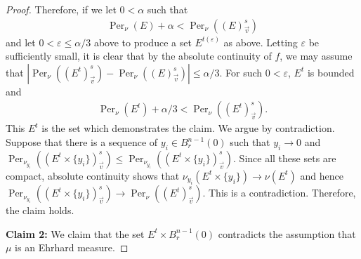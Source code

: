\documentclass[12pt]{amsart}
\numberwithin{equation}{section}
\theoremstyle{plain}
\theoremstyle{definition}
\begin{document}
\begin{proof}
Therefore, if we let $0<\alpha$ such that
\begin{align}
    \operatorname{Per}_{\nu}(E) + \alpha < \operatorname{Per}_{\nu}((E)^s_{\vec{v}})
\end{align} 
and let $0<\varepsilon \le \alpha/3$ above to produce a set $E^{t(\varepsilon)}$ as above.  Letting $\varepsilon$ be sufficiently small, it is clear that by the absolute continuity of $f$, we may assume that $|\operatorname{Per}_{\nu}((E^{t})^s_{\vec{v}}) - \operatorname{Per}_{\nu}((E)^s_{\vec{v}})| \le \alpha/3$. For such $0<\varepsilon$, $E^{t}$ is bounded and 
\begin{align}
    \operatorname{Per}_{\nu}(E^{t}) + \alpha/3 < \operatorname{Per}_{\nu}((E^{t})^s_{\vec{v}}).
\end{align}
This $E^t$ is the set which demonstrates the claim.  We argue by contradiction.  Suppose that there is a sequence of $y_i \in B_r^{n-1}(0)$ such that $y_i \rightarrow 0$ and $\operatorname{Per}_{\nu_{y_i}}((E^t \times \{y_i\})^s_{\vec{v}}) \le \operatorname{Per}_{\nu_{y_i}}((E^t \times \{y_i\})^s_{\vec{v}})$.  Since all these sets are compact, absolute continuity shows that $\nu_{y_i}(E^t \times \{y_i\}) \rightarrow \nu(E^{t})$ and hence $\operatorname{Per}_{\nu_{y_i}}((E^t \times \{y_i\})^s_{\vec{v}}) \rightarrow \operatorname{Per}_{\nu}((E^{t})^s_{\vec{v}})$. This is a contradiction.  Therefore, the claim holds.

\textbf{Claim 2:} We claim that the set $E^{t} \times B_r^{n-1}(0)$ contradicts the assumption that $\mu$ is an Ehrhard measure. 


\end{proof}
\end{document}
